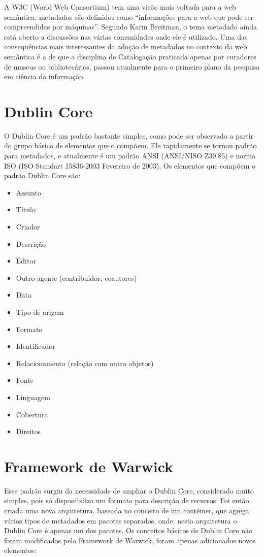 A W3C (World Web Consortium) tem uma visão mais voltada para a web semântica. metadados são definidos como “informações para a web que pode ser compreendidas por máquinas”. Segundo Karin Breitman,  o tema metadado ainda está aberto a discussões nas várias comunidades onde ele é utilizado. Uma das consequências mais interessantes da adoção de metadados no contexto da web semântica é a de que a disciplina de Catalogação praticada apenas por curadores de museus ou bibliotecários, passou atualmente para o primeiro plano da pesquisa em ciência da informação. 

\section{Dublin Core}
O Dublin Core é um padrão bastante simples, como pode ser observado a partir do grupo básico de elementos que o compõem. Ele rapidamente se tornou padrão para metadados, e atualmente é um padrão ANSI (ANSI/NISO Z39.85) e norma ISO (ISO Standart 15836-2003 Fevereiro de 2003). Os elementos que compõem o padrão Dublin Core são: 

\begin{itemize}
\item Assunto
\item Título
\item Criador
\item Descrição
\item Editor
\item Outro agente (contribuidor, coautores)
\item Data
\item Tipo de origem
\item Formato
\item Identificador
\item Relacionamento (relação com outro objetos)
\item Fonte
\item Linguagem
\item Cobertura
\item Direitos
\end{itemize}

\section{Framework de Warwick}

Esse padrão surgiu da necessidade de ampliar o Dublin Core, considerado muito simples, pois só disponibiliza um formato para descrição de recursos. Foi então criada uma nova arquitetura, baseada no conceito de um contêiner, que agrega vários tipos de metadados em pacotes separados, onde, nesta arquitetura o Dublin Core é apenas um dos pacotes. Os conceitos básicos de Dublin Core não foram modificados pelo Framework de Warwick, foram apenas adicionados novos elementos: 

